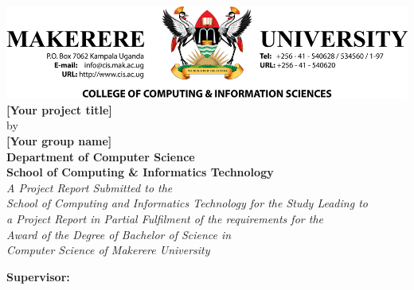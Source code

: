 \begin{titlepage}

\begin{center}

\includegraphics[width=1\textwidth]{img/maklogo}\\%
\vspace{3em}%
\Large \textbf {[Your project title]}\\%
\vspace{1em}%
\normalsize by \\%
\vspace{1em}
\textup{\small {\bf [Your group name]}\\}
 \vspace{1em}%
{\bf Department of Computer Science \\ School of Computing \& Informatics Technology}\\[0.5in]

\emph{A Project Report Submitted to the \\School of Computing and Informatics Technology
for the Study Leading to\\ a Project Report in Partial Fulfilment of the
requirements for the\\ Award of the Degree of Bachelor of Science in \\Computer Science
of Makerere University}

        \vspace{1in}

       

\normalsize {\bf Supervisor:} \\


\end{center}
\end{titlepage}
